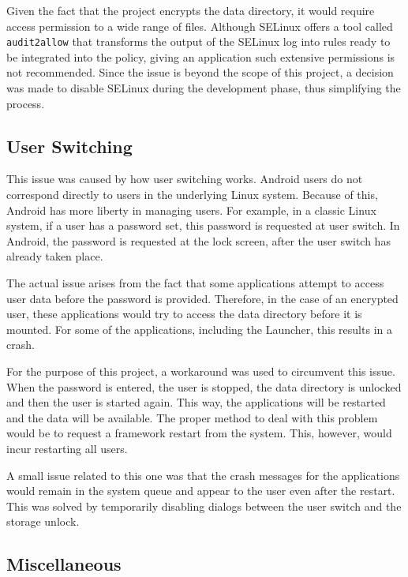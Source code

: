 Given the fact that the project encrypts the data directory, it would require access permission to a wide range of files. Although SELinux offers a tool called \texttt{audit2allow} that transforms the output of the SELinux log into rules ready to be integrated into the policy, giving an application such extensive permissions is not recommended. Since the issue is beyond the scope of this project, a decision was made to disable SELinux during the development phase, thus simplifying the process.

\subsection{User Switching}
\label{sub-sec:user-switch-multi-user}

This issue was caused by how user switching works. Android users do not correspond directly to users in the underlying Linux system. Because of this, Android has more liberty in managing users. For example, in a classic Linux system, if a user has a password set, this password is requested at user switch. In Android, the password is requested at the lock screen, after the user switch has already taken place.

The actual issue arises from the fact that some applications attempt to access user data before the password is provided. Therefore, in the case of an encrypted user, these applications would try to access the data directory before it is mounted. For some of the applications, including the Launcher, this results in a crash.

For the purpose of this project, a workaround was used to circumvent this issue. When the password is entered, the user is stopped, the data directory is unlocked and then the user is started again. This way, the applications will be restarted and the data will be available. The proper method to deal with this problem would be to request a framework restart from the system. This, however, would incur restarting all users.

A small issue related to this one was that the crash messages for the applications would remain in the system queue and appear to the user even after the restart. This was solved by temporarily disabling dialogs between the user switch and the storage unlock.

\subsection{Miscellaneous}
\label{sub-sec:misc-mult-user}

